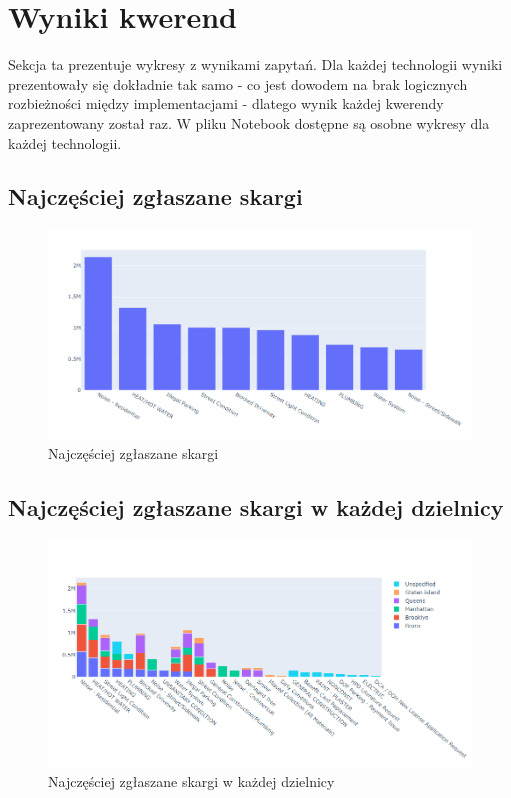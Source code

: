\documentclass{classrep}
\begin{document}
\section{Wyniki kwerend}
Sekcja ta prezentuje wykresy z wynikami zapytań. Dla każdej technologii wyniki prezentowały się dokładnie tak samo - co jest dowodem na brak logicznych rozbieżności między implementacjami - dlatego wynik każdej kwerendy zaprezentowany został raz. W pliku Notebook dostępne są osobne wykresy dla każdej technologii.

\subsection{Najczęściej zgłaszane skargi}

\begin{figure}[H]
    \centering
    \includegraphics[width=1\textwidth]{images1/pandas_complaint.png}
    \caption{Najczęściej zgłaszane skargi}
    \label{q1}
\end{figure}

\subsection{Najczęściej zgłaszane skargi w każdej dzielnicy}

\begin{figure}[H]
    \centering
    \includegraphics[width=1\textwidth]{images1/pandas_borough.png}
    \caption{Najczęściej zgłaszane skargi w każdej dzielnicy}
    \label{q2}
\end{figure}
\end{document}
